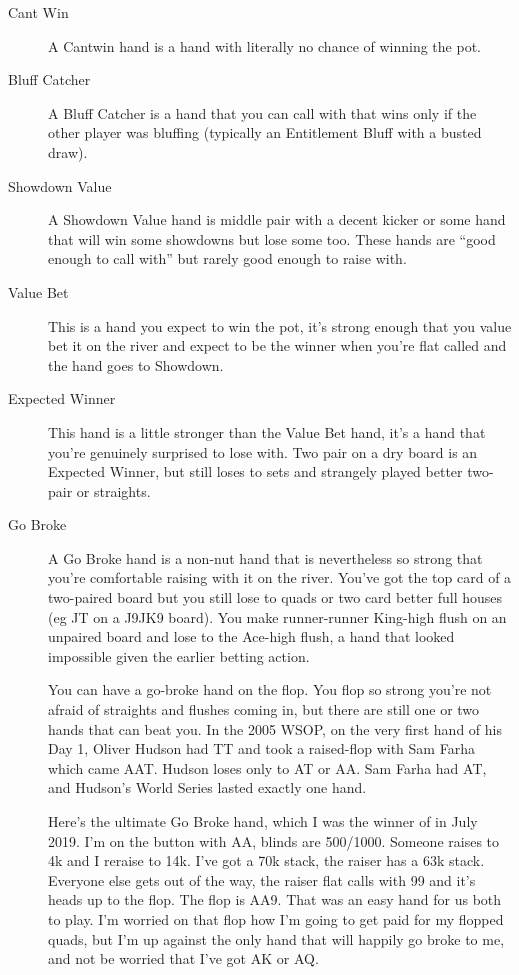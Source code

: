 \begin{description}

\item[Cant Win] A Cantwin hand is a hand with literally no chance of
winning the pot.

\item[Bluff Catcher] A Bluff Catcher is a hand that you can call with
that wins only if the other player was bluffing (typically an
Entitlement Bluff with a busted draw).

\item[Showdown Value] A Showdown Value hand is middle pair with a
decent kicker or some hand that will win some showdowns but lose some
too. These hands are ``good enough to call with'' but rarely good
enough to raise with.

\item[Value Bet] This is a hand you expect to win the pot, it's strong
enough that you value bet it on the river and expect to be the winner
when you're flat called and the hand goes to Showdown.

\item[Expected Winner] This hand is a little stronger than the Value
Bet hand, it's a hand that you're genuinely surprised to lose
with. Two pair on a dry board is an Expected Winner, but still loses
to sets and strangely played better two-pair or straights.

\item[Go Broke] A Go Broke hand is a non-nut hand that is nevertheless
so strong that you're comfortable raising with it on the river. You've
got the top card of a two-paired board but you still lose to quads or
two card better full houses (eg JT on a J9JK9 board). You make
runner-runner King-high flush on an unpaired board and lose to the
Ace-high flush, a hand that looked impossible given the earlier
betting action.

You can have a go-broke hand on the flop. You flop so strong you're
not afraid of straights and flushes coming in, but there are still one
or two hands that can beat you. In the 2005 WSOP, on the very first
hand of his Day 1, Oliver Hudson had TT and took a raised-flop with
Sam Farha which came AAT. Hudson loses only to AT or AA. Sam Farha had
AT, and Hudson's World Series lasted exactly one hand.

Here's the ultimate Go Broke hand, which I was the winner of in July 2019.
I'm on the button with AA, blinds are 500/1000. Someone raises to 4k and
I reraise to 14k. I've got a 70k stack, the raiser has a 63k stack.
Everyone else gets out of the way, the raiser flat calls with 99
and it's heads up to the flop. The flop is AA9. That was an easy hand
for us both to play. I'm worried on that flop how I'm going to get
paid for my flopped quads, but I'm up against the only hand that will
happily go broke to me, and not be worried that I've got AK or AQ.


\end{description}
